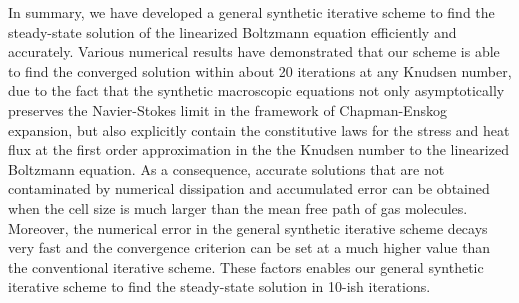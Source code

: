 In summary, we have developed a general synthetic iterative scheme to find the steady-state solution of the linearized Boltzmann equation efficiently and accurately. Various numerical results have demonstrated that our scheme is able to find the converged solution within about 20 iterations at any Knudsen number, due to the fact that the synthetic macroscopic equations not only asymptotically preserves the Navier-Stokes limit in the framework of Chapman-Enskog expansion, but also explicitly contain the constitutive laws for the stress and heat flux at the first order approximation in the the Knudsen number to the linearized Boltzmann equation. As a consequence, accurate solutions that are not contaminated by numerical dissipation and accumulated error can be obtained when the cell size is much larger than the mean free path of gas molecules. Moreover, the numerical error in the general synthetic iterative scheme decays very fast and the convergence criterion can be set at a much higher value than the conventional iterative scheme. These factors enables our general synthetic iterative scheme to find the steady-state solution in 10-ish iterations.


